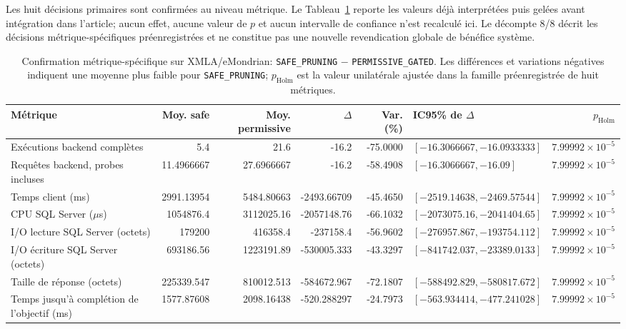 Les huit décisions primaires sont confirmées au niveau métrique. Le Tableau~\ref{tab:r3e14-xmla-primary}
reporte les valeurs déjà interprétées puis gelées avant intégration dans l'article; aucun effet,
aucune valeur de $p$ et aucun intervalle de confiance n'est recalculé ici. Le décompte 8/8
décrit les décisions métrique-spécifiques préenregistrées et ne constitue pas une nouvelle
revendication globale de bénéfice système.

\begin{table}[t]
\centering
\caption{Confirmation métrique-spécifique sur XMLA/eMondrian:
\texttt{SAFE\_PRUNING} $-$ \texttt{PERMISSIVE\_GATED}. Les différences et variations
négatives indiquent une moyenne plus faible pour \texttt{SAFE\_PRUNING}; $p_{\mathrm{Holm}}$
est la valeur unilatérale ajustée dans la famille préenregistrée de huit métriques.}
\label{tab:r3e14-xmla-primary}
\scriptsize
\setlength{\tabcolsep}{2.4pt}
\begin{tabular}{p{}rrrrp{}r}
\toprule
Métrique & Moy. safe & Moy. permissive & $\Delta$ & Var. (\%) & IC95\% de $\Delta$ & $p_{\mathrm{Holm}}$ \\
\midrule
Exécutions backend complètes
& 5.4 & 21.6 & -16.2 & -75.0000 & $[-16.3066667,-16.0933333]$ & $7.99992{\times}10^{-5}$ \\
Requêtes backend, probes incluses
& 11.4966667 & 27.6966667 & -16.2 & -58.4908 & $[-16.3066667,-16.09]$ & $7.99992{\times}10^{-5}$ \\
Temps client (ms)
& 2991.13954 & 5484.80663 & -2493.66709 & -45.4650 & $[-2519.14638,-2469.57544]$ & $7.99992{\times}10^{-5}$ \\
CPU SQL Server ($\mu$s)
& 1054876.4 & 3112025.16 & -2057148.76 & -66.1032 & $[-2073075.16,-2041404.65]$ & $7.99992{\times}10^{-5}$ \\
I/O lecture SQL Server (octets)
& 179200 & 416358.4 & -237158.4 & -56.9602 & $[-276957.867,-193754.112]$ & $7.99992{\times}10^{-5}$ \\
I/O écriture SQL Server (octets)
& 693186.56 & 1223191.89 & -530005.333 & -43.3297 & $[-841742.037,-23389.0133]$ & $7.99992{\times}10^{-5}$ \\
Taille de réponse (octets)
& 225339.547 & 810012.513 & -584672.967 & -72.1807 & $[-588492.829,-580817.672]$ & $7.99992{\times}10^{-5}$ \\
Temps jusqu'à complétion de l'objectif (ms)
& 1577.87608 & 2098.16438 & -520.288297 & -24.7973 & $[-563.934414,-477.241028]$ & $7.99992{\times}10^{-5}$ \\
\bottomrule
\end{tabular}
\end{table}

